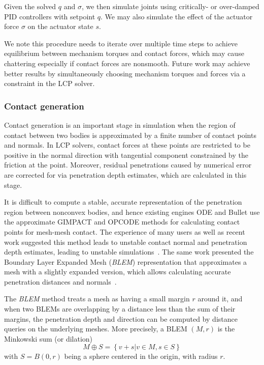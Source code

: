 Given the solved $q$ and $\sigma$, we then simulate joints using critically- or over-damped PID controllers with setpoint $q$.  We may also simulate the effect of the actuator force $\sigma$ on the actuator state $s$.

We note this procedure needs to iterate over multiple time steps to achieve equilibrium between mechanism torques and contact forces, which may cause chattering especially if contact forces are nonsmooth. Future work may achieve better results by simultaneously choosing mechanism torques and forces via a constraint in the LCP solver.

\subsubsection{Contact generation}
Contact generation is an important stage in simulation when the region of contact between two bodies is approximated by a finite number of contact points and normals. In LCP solvers, contact forces at these points are restricted to be positive in the normal direction with tangential component constrained by the friction at the point. Moreover, residual penetrations caused by numerical error are corrected for via penetration depth estimates, which are calculated in this stage.

It is difficult to compute a stable, accurate representation of the penetration region between nonconvex bodies, and hence existing engines ODE and Bullet use the approximate GIMPACT and OPCODE methods for calculating contact points for mesh-mesh contact. The experience of many users as well as recent work suggested this method leads to unstable contact normal and penetration depth estimates, leading to unstable simulations~\cite{Hauser13BLEM}.  The same work presented the Boundary Layer Expanded Mesh (\emph{BLEM}) representation that approximates a mesh with a slightly expanded version, which allows calculating accurate penetration distances and normals~\cite{Hauser13BLEM}. 

The \emph{BLEM} method treats a mesh as having a small margin $r$ around it, and when two BLEMs are overlapping by a distance less than the sum of their margins, the penetration depth and direction can be computed by distance queries on the underlying meshes.  More precisely, a BLEM $(M,r)$ is the Minkowski sum (or dilation) 
\begin{equation}
M \oplus S=\left\{v+s|v \in M,s \in S\right\}
\end{equation}
with $S=B(0,r)$ being a sphere centered in the origin, with radius $r$.

